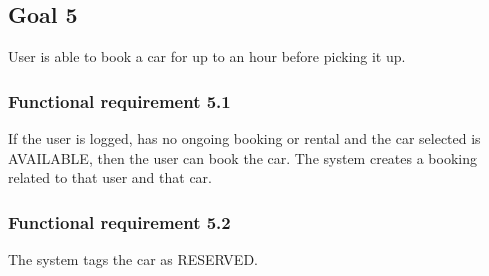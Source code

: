 \subsection{Goal 5}
User is able to book a car for up to an hour before picking it up.

\setcounter{secnumdepth}{3}
\subsubsection{Functional requirement 5.1}
If the user is logged, has no ongoing booking or rental and the car selected is AVAILABLE, then the user can book the car. The system creates a booking related to that user and that car.

\subsubsection{Functional requirement 5.2}
The system tags the car as RESERVED.
